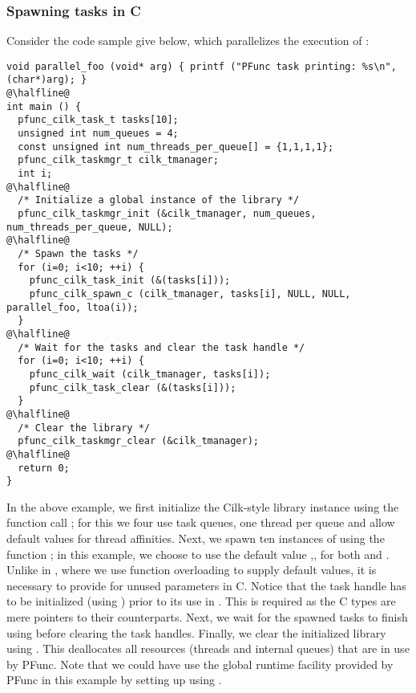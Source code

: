 \subsubsection{Spawning tasks in C}
\label{subsubsec:spawn_c}
Consider the code sample give below, which parallelizes the execution of 
:
%
\begin{lstlisting}
void parallel_foo (void* arg) { printf ("PFunc task printing: %s\n", (char*)arg); }
@\halfline@
int main () {
  pfunc_cilk_task_t tasks[10];
  unsigned int num_queues = 4;
  const unsigned int num_threads_per_queue[] = {1,1,1,1};
  pfunc_cilk_taskmgr_t cilk_tmanager;
  int i;
@\halfline@
  /* Initialize a global instance of the library */
  pfunc_cilk_taskmgr_init (&cilk_tmanager, num_queues, num_threads_per_queue, NULL);
@\halfline@
  /* Spawn the tasks */
  for (i=0; i<10; ++i) {
    pfunc_cilk_task_init (&(tasks[i]));
    pfunc_cilk_spawn_c (cilk_tmanager, tasks[i], NULL, NULL, parallel_foo, ltoa(i));
  }
@\halfline@
  /* Wait for the tasks and clear the task handle */
  for (i=0; i<10; ++i) {
    pfunc_cilk_wait (cilk_tmanager, tasks[i]);
    pfunc_cilk_task_clear (&(tasks[i]));
  }
@\halfline@
  /* Clear the library */
  pfunc_cilk_taskmgr_clear (&cilk_tmanager);
@\halfline@
  return 0;
}
\end{lstlisting}
%
In the above example, we first initialize the Cilk-style library instance using the
function call ; for this we four use task
queues, one thread per queue and allow default values for thread affinities.
%
Next, we spawn ten instances of  using the function
; in this example, we choose to use the default value
,, for both  and . 
%
Unlike in \Cpp{}, where we use function overloading to supply default values, 
it is necessary to provide  for unused parameters in C.
%
Notice that the task handle has to be initialized (using
) prior to its use in . 
%
This is required as the C types are mere pointers to their \Cpp{} counterparts. 
%
Next, we wait for the spawned tasks to finish using
 before clearing the task handles. 
%
Finally, we clear the initialized library using
. 
%
This deallocates all resources (threads and internal queues) that are in use by
PFunc. 
%
Note that we could have use the global runtime facility provided by PFunc in
this example by setting up  using .

